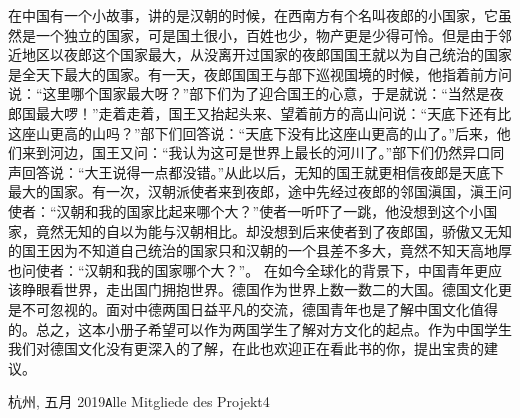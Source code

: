 \par
 在中国有一个小故事，讲的是汉朝的时候，在西南方有个名叫夜郎的小国家，它虽然是一个独立的国家，可是国土很小，百姓也少，物产更是少得可怜。但是由于邻近地区以夜郎这个国家最大，从没离开过国家的夜郎国国王就以为自己统治的国家是全天下最大的国家。有一天，夜郎国国王与部下巡视国境的时候，他指着前方问说：“这里哪个国家最大呀？”部下们为了迎合国王的心意，于是就说：“当然是夜郎国最大啰！”走着走着，国王又抬起头来、望着前方的高山问说：“天底下还有比这座山更高的山吗？”部下们回答说：“天底下没有比这座山更高的山了。”后来，他们来到河边，国王又问：“我认为这可是世界上最长的河川了。”部下们仍然异口同声回答说：“大王说得一点都没错。”从此以后，无知的国王就更相信夜郎是天底下最大的国家。有一次，汉朝派使者来到夜郎，途中先经过夜郎的邻国滇国，滇王问使者：“汉朝和我的国家比起来哪个大？”使者一听吓了一跳，他没想到这个小国家，竟然无知的自以为能与汉朝相比。却没想到后来使者到了夜郎国，骄傲又无知的国王因为不知道自己统治的国家只和汉朝的一个县差不多大，竟然不知天高地厚也问使者：“汉朝和我的国家哪个大？”。
 在如今全球化的背景下，中国青年更应该睁眼看世界，走出国门拥抱世界。德国作为世界上数一数二的大国。德国文化更是不可忽视的。面对中德两国日益平凡的交流，德国青年也是了解中国文化值得的。总之，这本小册子希望可以作为两国学生了解对方文化的起点。作为中国学生我们对德国文化没有更深入的了解，在此也欢迎正在看此书的你，提出宝贵的建议。
\vspace{\baselineskip}
\begin{flushright}\noindent
杭州, 五月 2019\hfill {\texttt Alle Mitgliede des Projekt4}\\
\end{flushright}
